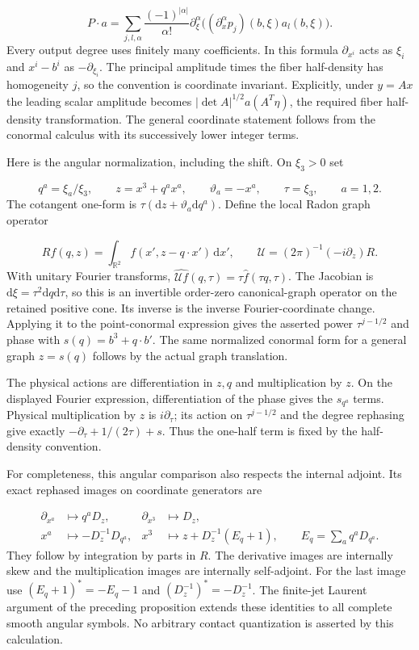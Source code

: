 \documentclass[
  english,
  11pt,
  reqno]{amsart}
\begin{document}
\label{eq:online-point-conormal-module-action} \[
P\cdot a=
\sum_{j,l,\alpha}\frac{(-1)^{|\alpha|}}{\alpha!}
\partial_\xi^\alpha
\bigl((\partial_x^\alpha p_j)(b,\xi)a_l(b,\xi)\bigr).
\] Every output degree uses finitely many coefficients. In this formula
\(\partial_{x^i}\) acts as \(\xi_i\) and \(x^i-b^i\) as
\(-\partial_{\xi_i}\). The principal amplitude times the fiber
half-density has homogeneity \(j\), so the convention is coordinate
invariant. Explicitly, under \(y=Ax\) the leading scalar amplitude
becomes \(|\det A|^{1/2}a(A^T\eta)\), the required fiber half-density
transformation. The general coordinate statement follows from the
conormal calculus with its successively lower integer terms.

Here is the angular normalization, including the shift. On \(\xi_3>0\)
set

\label{eq:online-angular-legendre-coordinates} \[
q^a=\xi_a/\xi_3,\qquad
z=x^3+q^ax^a,\qquad
\vartheta_a=-x^a,\qquad
\tau=\xi_3,
\qquad a=1,2.
\] The cotangent one-form is
\(\tau(\mathrm dz+\vartheta_a\mathrm dq^a)\). Define the local Radon
graph operator

\label{eq:online-normalized-angular-radon} \[
Rf(q,z)=\int_{\mathbb R^2}f(x',z-q\cdot x')\,\mathrm dx',
\qquad
\mathcal U=(2\pi)^{-1}(-i\partial_z)R.
\] With unitary Fourier transforms,
\(\widehat{\mathcal U f}(q,\tau)=\tau\widehat f(\tau q,\tau)\). The
Jacobian is \(\mathrm d\xi=\tau^2\mathrm dq\mathrm d\tau\), so this is
an invertible order-zero canonical-graph operator on the retained
positive cone. Its inverse is the inverse Fourier-coordinate change.
Applying it to the point-conormal expression gives the asserted power
\(\tau^{j-1/2}\) and phase with \(s(q)=b^3+q\cdot b'\). The same
normalized conormal form for a general graph \(z=s(q)\) follows by the
actual graph translation.

The physical actions are differentiation in \(z,q\) and multiplication
by \(z\). On the displayed Fourier expression, differentiation of the
phase gives the \(s_{q^a}\) terms. Physical multiplication by \(z\) is
\(i\partial_\tau\); its action on \(\tau^{j-1/2}\) and the degree
rephasing give exactly \(-\partial_\tau+1/(2\tau)+s\). Thus the one-half
term is fixed by the half-density convention.

For completeness, this angular comparison also respects the internal
adjoint. Its exact rephased images on coordinate generators are

\label{eq:online-angular-exact-generator-map} \[
\begin{aligned}
\partial_{x^a}&\longmapsto q^aD_z,&
\partial_{x^3}&\longmapsto D_z,\\
x^a&\longmapsto-D_z^{-1}D_{q^a},&
x^3&\longmapsto z+D_z^{-1}(E_q+1),
\qquad E_q=\sum_aq^aD_{q^a}.
\end{aligned}
\] They follow by integration by parts in \(R\). The derivative images
are internally skew and the multiplication images are internally
self-adjoint. For the last image use \((E_q+1)^*=-E_q-1\) and
\((D_z^{-1})^*=-D_z^{-1}\). The finite-jet Laurent argument of the
preceding proposition extends these identities to all complete smooth
angular symbols. No arbitrary contact quantization is asserted by this
calculation.
\end{document}
